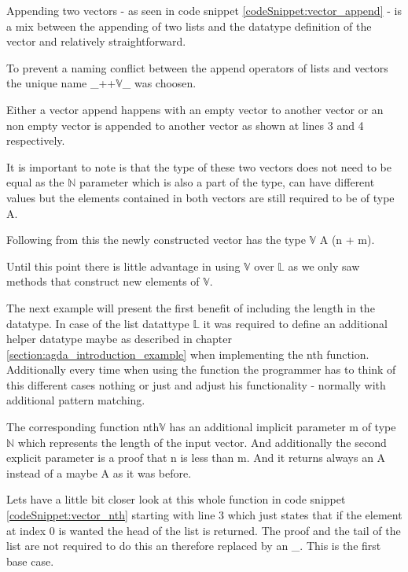 Appending two vectors - as seen in code snippet \ref{codeSnippet:vector_append} - is a mix between the appending of two lists and the datatype definition of the vector and relatively straightforward.

To prevent a naming conflict between the append operators of lists and vectors the unique name \_++$\mathbb{V}$\_ was choosen.

Either a vector append happens with an empty vector to another vector or an non empty vector is appended to another vector as shown at lines 3 and 4 respectively.

It is important to note is that the type of these two vectors does not need to be equal as the $\mathbb{N}$ parameter which is also a part of the type, can have different values but the elements contained in both vectors are still required to be of type A.

Following from this the newly constructed vector has the type $\mathbb{V}$ A (n + m).
\begin{codesnippet}[mathescape=true, caption={Definition of the vector append function in Agda}, label={codeSnippet:vector_append}]
_++$\mathbb{V}$_ : $\forall$ {$\ell$} {A : Set $\ell$}  {n m: $\mathbb{N}$ $\rightarrow$
        $\mathbb{V}$ A n $\rightarrow \mathbb{V}$ A m $\rightarrow \mathbb{V}$ A (n + m)
  []        ++$\mathbb{V}$ ys = ys
  (x :: xs) ++$\mathbb{V}$ ys = x :: (xs ++$\mathbb{V}$ ys)
\end{codesnippet}

Until this point there is little advantage in using $\mathbb{V}$ over $\mathbb{L}$ as we only saw methods that construct new elements of $\mathbb{V}$.

The next example will present the first benefit of including the length in the datatype.
In case of the list datattype $\mathbb{L}$ it was required to define an additional helper datatype maybe as described in chapter \ref{section:agda_introduction_example} when implementing the nth function.
Additionally every time when using the function the programmer has to think of this different cases nothing or just and adjust his functionality - normally with additional pattern matching.

The corresponding function nth$\mathbb{V}$ has an additional implicit parameter m of type $\mathbb{N}$ which represents the length of the input vector. 
And additionally the second explicit parameter is a proof that n is less than m. And it returns always an A instead of a maybe A as it was before.

Lets have a little bit closer look at this whole function in code snippet \ref{codeSnippet:vector_nth} starting with line 3 which just states that if the element at index 0 is wanted the head of the list is returned. 
The proof and the tail of the list are not required to do this an therefore replaced by an \_. This is the first base case.

